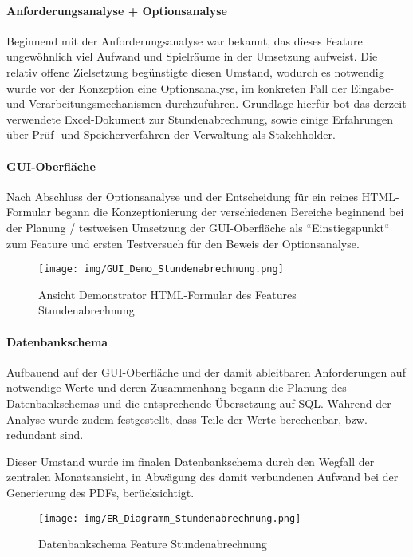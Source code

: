 \documentclass[12pt,a4paper]{scrartcl}
\begin{document}
\paragraph*{Anforderungsanalyse + Optionsanalyse}

Beginnend mit der Anforderungsanalyse war bekannt, das dieses Feature ungewöhnlich viel Aufwand und Spielräume in der Umsetzung aufweist. Die relativ offene Zielsetzung begünstigte diesen Umstand, wodurch es notwendig wurde vor der Konzeption eine Optionsanalyse, im konkreten Fall der Eingabe- und Verarbeitungsmechanismen durchzuführen. Grundlage hierfür bot das derzeit verwendete Excel-Dokument zur Stundenabrechnung, sowie einige Erfahrungen über Prüf- und Speicherverfahren der Verwaltung als Stakehholder.

\paragraph*{GUI-Oberfläche}

Nach Abschluss der Optionsanalyse und der Entscheidung für ein reines HTML-Formular begann die Konzeptionierung der verschiedenen Bereiche beginnend bei der Planung / testweisen Umsetzung der GUI-Oberfläche als “Einstiegspunkt“ zum Feature und ersten Testversuch für den Beweis der Optionsanalyse. 

\begin{figure}[H]
	\centering
	\texttt{[image: img/GUI\_Demo\_Stundenabrechnung.png]}
	\caption{Ansicht Demonstrator HTML-Formular des Features Stundenabrechnung}
	\label{fig:bpmn-process}
\end{figure}

\paragraph*{Datenbankschema}

Aufbauend auf der GUI-Oberfläche und der damit ableitbaren Anforderungen auf notwendige Werte und deren Zusammenhang begann die Planung des Datenbankschemas und die entsprechende Übersetzung auf SQL. Während der Analyse wurde zudem festgestellt, dass Teile der Werte berechenbar, bzw. redundant sind. 

Dieser Umstand wurde im finalen Datenbankschema durch den Wegfall der zentralen Monatsansicht, in Abwägung des damit verbundenen Aufwand bei der Generierung des PDFs, berücksichtigt.\\

\begin{figure}[H]
	\centering
	\texttt{[image: img/ER\_Diagramm\_Stundenabrechnung.png]}
	\caption{Datenbankschema Feature Stundenabrechnung}
	\label{fig:bpmn-process}
\end{figure}
\end{document}
